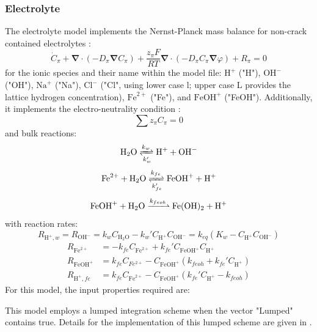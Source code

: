 \documentclass[3p]{elsarticle} %
\begin{document}
\subsubsection{Electrolyte}
The electrolyte model implements the Nernst-Planck mass balance for non-crack contained electrolytes \citep{Planck1890}:
\begin{equation}
    \dot{C}_{\pi}+\bm{\nabla}\cdot\left(-D_\pi \bm{\nabla}C_\pi\right) + \frac{z_\pi F}{RT} \bm{\nabla} \cdot \left(-D_\pi C_\pi \bm{\nabla} \varphi\right) +R_\pi = 0 
\end{equation}
for the ionic species and their name within the model file: $\mathrm{H}^+$ ("H"), $\mathrm{OH}^-$ ("OH"), $\mathrm{Na}^+$ ("Na"), $\mathrm{Cl}^-$ ("Cl", using lower case l; upper case L provides the lattice hydrogen concentration), $\mathrm{Fe}^{2+}$ ("Fe"), and $\mathrm{FeOH}^{+}$ ("FeOH"). Additionally, it implements the electro-neutrality condition \citep{Sarkar2011, Feldberg2000}:
\begin{equation}
	\sum z_\pi C_\pi = 0
\end{equation}
and bulk reactions:
\begin{equation}
    \mathrm{H}_2\mathrm{O} \xrightleftharpoons[k_{w}']{k_{w}} \mathrm{H}^+ + \mathrm{OH}^- \label{react:water}
\end{equation}
\begin{equation}
    \mathrm{Fe}^{2+} + \mathrm{H}_2\mathrm{O} \xrightleftharpoons[k_{fe}']{k_{fe}} \mathrm{FeOH}^+ + \mathrm{H}^+ \label{react:fe_feoh}
\end{equation}
\begin{equation}
    \mathrm{FeOH}^{+} + \mathrm{H}_2\mathrm{O} \xrightharpoonup{k_{feoh}} \mathrm{Fe}(\mathrm{OH})_2 + \mathrm{H}^+ \label{react:feoh_feoh2}
\end{equation}
with reaction rates:
\begin{equation}
    R_{\mathrm{H}^+,w}=R_{\mathrm{OH}^-} = k_{w}C_{\mathrm{H}_2\mathrm{O}} - k_{w}'C_{\mathrm{H}^+}C_{\mathrm{OH}^-}  = k_{eq} \left(K_w-C_{\mathrm{H}^+} C_{\mathrm{OH}^-} \right) \label{eq:water_react}
\end{equation}
\begin{align}
    R_{\mathrm{Fe}^{2+}}&=-k_{fe}C_{\mathrm{Fe}^{2+}}+k_{fe}'C_{\mathrm{FeOH}^+}C_{\mathrm{H}^+} \\
    R_{\mathrm{FeOH}^+}&=k_{fe}C_{Fe^{2+}}-C_{\mathrm{FeOH}^+}(k_{feoh}+k_{fe}'C_{\mathrm{H}^+})\\
    R_{\mathrm{H}^+,fe}&=k_{fe}C_{\mathrm{Fe}^{2+}}-C_{\mathrm{FeOH}^+}(k_{fe}'C_{\mathrm{H}^+}-k_{feoh}) \label{eq:H_Part2}
\end{align}
For this model, the input properties required are:

This model employs a lumped integration scheme when the vector "Lumped" contains true. Details for the implementation of this lumped scheme are given in \citep{Hageman2023a}.
\end{document}
